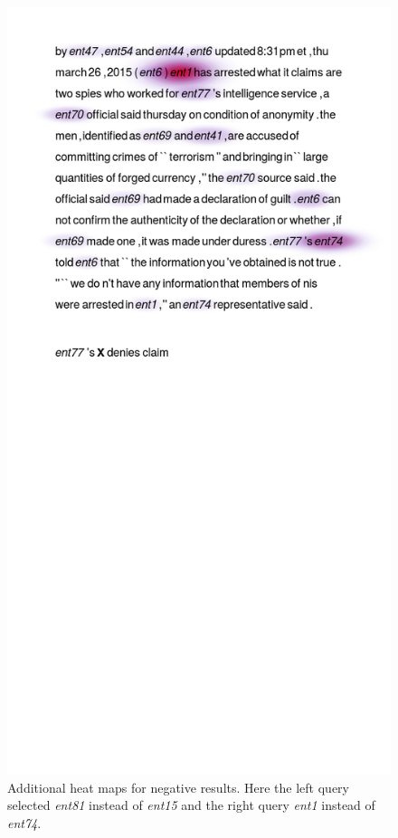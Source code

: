 \begin{figure}[t]
  \includegraphics[scale=0.3,clip=true,trim=2cm 30cm 3cm 2cm]{figs/badexamples/15.png}
  \caption{
	   Additional heat maps for negative results. Here the left query
           selected \textit{ent81} instead of \textit{ent15} and the right query
           \textit{ent1} instead of \textit{ent74}.
         }
  \label{fig:heatmapsD}
\end{figure}


